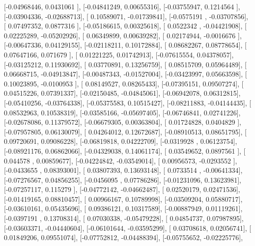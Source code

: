 \documentclass{article}
\begin{document}
       [-0.04968446,  0.0431061 ],
       [-0.04841249,  0.00655316],
       [-0.03755947,  0.1214564 ],
       [-0.03904336, -0.02688713],
       [ 0.10589071, -0.01739841],
       [-0.0575191 , -0.03707856],
       [ 0.07497352,  0.0877316 ],
       [-0.05186615,  0.00325618],
       [ 0.0522342 , -0.04421908],
       [ 0.02225289, -0.05202926],
       [ 0.06349899,  0.00639282],
       [ 0.02174944, -0.0016676 ],
       [-0.00647336,  0.04129155],
       [-0.02118211,  0.10172884],
       [ 0.08682267,  0.08778654],
       [ 0.07647166,  0.071679  ],
       [ 0.01221225,  0.01742913],
       [-0.07615554,  0.04378057],
       [-0.03125212,  0.11930692],
       [ 0.03770891,  0.13256759],
       [ 0.08515709,  0.05964489],
       [ 0.06668715, -0.04913847],
       [-0.00487343, -0.01527004],
       [-0.03423997,  0.05663598],
       [ 0.10023895, -0.0100953 ],
       [ 0.08149527,  0.08265433],
       [-0.07395151,  0.09507274],
       [ 0.04515226,  0.07391337],
       [-0.02150485, -0.04845061],
       [-0.06942078,  0.06312815],
       [-0.05410256, -0.03764338],
       [-0.05375583,  0.10515427],
       [-0.08211883, -0.04144435],
       [ 0.08532963,  0.10538319],
       [-0.03585166, -0.05697405],
       [-0.06746841,  0.02741226],
       [-0.02678086,  0.11379572],
       [-0.06679305,  0.00363804],
       [ 0.01724828,  0.0404829 ],
       [-0.07957805,  0.06130079],
       [ 0.04264012,  0.12672687],
       [-0.08910513,  0.08651795],
       [ 0.09720691,  0.09086228],
       [-0.06819818,  0.04222709],
       [-0.0319928 ,  0.06123754],
       [-0.08921176,  0.06862066],
       [-0.04329038,  0.14061174],
       [ 0.03549652,  0.0897561 ],
       [ 0.044578  ,  0.00859677],
       [-0.04224842, -0.03549014],
       [ 0.00956573, -0.0293552 ],
       [-0.0433655 ,  0.08393001],
       [ 0.03807393,  0.13693148],
       [ 0.0733514 , -0.00641334],
       [-0.07276567,  0.04856255],
       [-0.0456095 ,  0.07786286],
       [-0.01231096,  0.13623981],
       [-0.07257117,  0.115279  ],
       [-0.04772142, -0.04662487],
       [ 0.02520179,  0.02471536],
       [-0.01419165,  0.08810457],
       [ 0.00966167,  0.10789998],
       [-0.03509204,  0.05880717],
       [-0.03610161,  0.05435696],
       [ 0.09386121,  0.10317589],
       [-0.00887949,  0.01119261],
       [-0.0397191 ,  0.13708314],
       [ 0.07030338, -0.05479228],
       [ 0.04854737,  0.07987895],
       [-0.03603371, -0.04440604],
       [-0.06101644, -0.03595299],
       [ 0.03708618,  0.02056741],
       [ 0.01849206,  0.09551074],
       [-0.07752812, -0.04488394],
       [-0.05755652, -0.02225776],
\end{document}
